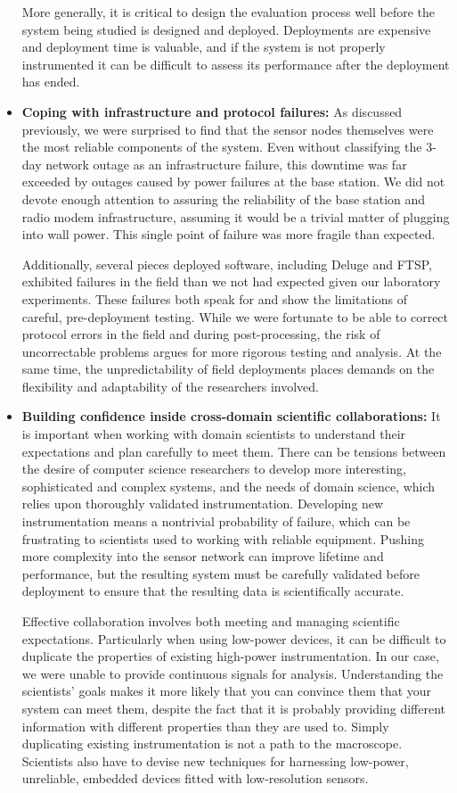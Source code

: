 \begin{itemize}
More generally, it is critical to design the evaluation process well before
the system being studied is designed and deployed. Deployments are expensive
and deployment time is valuable, and if the system is not properly
instrumented it can be difficult to assess its performance after the
deployment has ended.

\item \textbf{Coping with infrastructure and protocol failures:} As discussed
previously, we were surprised to find that the sensor nodes themselves were
the most reliable components of the system. Even without classifying the
3-day network outage as an infrastructure failure, this downtime was far
exceeded by outages caused by power failures at the base station. We did not
devote enough attention to assuring the reliability of the base station and
radio modem infrastructure, assuming it would be a trivial matter of plugging
into wall power. This single point of failure was more fragile than expected.

Additionally, several pieces deployed software, including Deluge and FTSP,
exhibited failures in the field than we not had expected given our laboratory
experiments. These failures both speak for and show the limitations of
careful, pre-deployment testing. While we were fortunate to be able to
correct protocol errors in the field and during post-processing, the risk of
uncorrectable problems argues for more rigorous testing and analysis. At the
same time, the unpredictability of field deployments places demands on the
flexibility and adaptability of the researchers involved.

\item \textbf{Building confidence inside cross-domain scientific
collaborations:} It is important when working with domain scientists to
understand their expectations and plan carefully to meet them. There can be
tensions between the desire of computer science researchers to develop more
interesting, sophisticated and complex systems, and the needs of domain
science, which relies upon thoroughly validated instrumentation. Developing
new instrumentation means a nontrivial probability of failure, which can be
frustrating to scientists used to working with reliable equipment. Pushing
more complexity into the sensor network can improve lifetime and performance,
but the resulting system must be carefully validated before deployment to
ensure that the resulting data is scientifically accurate.

Effective collaboration involves both meeting and managing scientific
expectations. Particularly when using low-power devices, it can be difficult
to duplicate the properties of existing high-power instrumentation.  In our
case, we were unable to provide continuous signals for analysis.
Understanding the scientists' goals makes it more likely that you can
convince them that your system can meet them, despite the fact that it is
probably providing different information with different properties than they
are used to. Simply duplicating existing instrumentation is not a path to the
macroscope. Scientists also have to devise new techniques for harnessing
low-power, unreliable, embedded devices fitted with low-resolution sensors.


\end{itemize}
